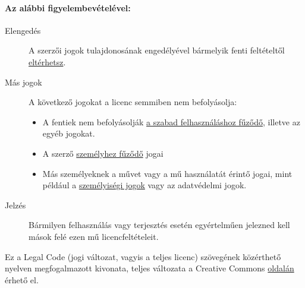 \documentclass[a4paper, titlepage]{report}
\begin{document}
\paragraph{Az alábbi figyelembevételével:}

\begin{description}
 \item[Elengedés] A szerzői jogok tulajdonosának engedélyével bármelyik fenti feltételtől \href{http://creativecommons.org/licenses/by-sa/2.5/hu/#}{eltérhetsz}.
 \item[Más jogok] A következő jogokat a licenc semmiben nem befolyásolja:
 \begin{itemize}
  \item A fentiek nem befolyásolják \href{http://wiki.creativecommons.org/Frequently_Asked_Questions#Do_Creative_Commons_licenses_affect_fair_use.2C_fair_dealing_or_other_exceptions_to_copyright.3F}{a szabad felhasználáshoz fűződő}, illetve az egyéb jogokat.
  \item A szerző \href{http://wiki.creativecommons.org/Frequently_Asked_Questions#I_don.E2.80.99t_like_the_way_a_person_has_used_my_work_in_a_derivative_work_or_included_it_in_a_collective_work.3B_what_can_I_do.3F}{személyhez fűződő} jogai
  \item Más személyeknek a művet vagy a mű használatát érintő jogai, mint például a \href{http://wiki.creativecommons.org/Frequently_Asked_Questions#When_are_publicity_rights_relevant.3F}{személyiségi jogok} vagy az adatvédelmi jogok.
 \end{itemize}
 \item[Jelzés] Bármilyen felhasználás vagy terjesztés esetén egyértelműen jelezned kell mások felé ezen mű licencfeltételeit. 
\end{description}

Ez a Legal Code (jogi változat, vagyis a teljes licenc) szövegének közérthető nyelven megfogalmazott kivonata, teljes változata a Creative Commons \href{http://creativecommons.org/licenses/by-sa/2.5/hu/legalcode}{oldalán} érhető el.

\newpage
{}
\printindex

\newpage
{}
\listoftables

\newpage
{}
\listoffigures

\newpage
{}
\lstlistoflistings

\newpage
{}


\end{document}
